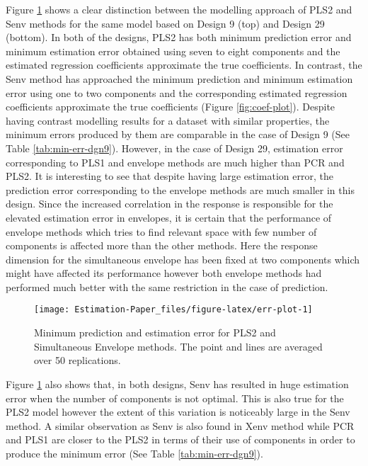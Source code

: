 \documentclass[12pt,3p,authoryear]{elsarticle}
\begin{document}
Figure \ref{fig:err-plot} shows a clear distinction between the modelling approach of PLS2 and Senv methods for the same model based on Design 9 (top) and Design 29 (bottom). In both of the designs, PLS2 has both minimum prediction error and minimum estimation error obtained using seven to eight components and the estimated regression coefficients approximate the true coefficients. In contrast, the Senv method has approached the minimum prediction and minimum estimation error using one to two components and the corresponding estimated regression coefficients approximate the true coefficients (Figure \ref{fig:coef-plot}). Despite having contrast modelling results for a dataset with similar properties, the minimum errors produced by them are comparable in the case of Design 9 (See Table \ref{tab:min-err-dgn9}). However, in the case of Design 29, estimation error corresponding to PLS1 and envelope methods are much higher than PCR and PLS2. It is interesting to see that despite having large estimation error, the prediction error corresponding to the envelope methods are much smaller in this design. Since the increased correlation in the response is responsible for the elevated estimation error in envelopes, it is certain that the performance of envelope methods which tries to find relevant space with few number of components is affected more than the other methods. Here the response dimension for the simultaneous envelope has been fixed at two components which might have affected its performance however both envelope methods had performed much better with the same restriction in the case of prediction.

\begin{figure}
\texttt{[image: Estimation-Paper\_files/figure-latex/err-plot-1]} \caption{Minimum prediction and estimation error for PLS2 and Simultaneous Envelope methods. The point and lines are averaged over 50 replications.}\label{fig:err-plot}
\end{figure}

Figure \ref{fig:err-plot} also shows that, in both designs, Senv has resulted in huge estimation error when the number of components is not optimal. This is also true for the PLS2 model however the extent of this variation is noticeably large in the Senv method. A similar observation as Senv is also found in Xenv method while PCR and PLS1 are closer to the PLS2 in terms of their use of components in order to produce the minimum error (See Table \ref{tab:min-err-dgn9}).
\end{document}
